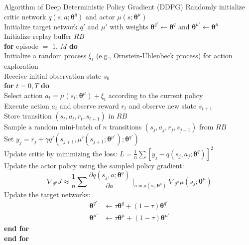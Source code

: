 \documentclass[11pt]{article}
\begin{document}
\begin{itembox}[l]{Algorithm of Deep Deterministic Policy Gradient (DDPG) \citep{Lillicrap:etal:2015}}
	Randomly initialize critic network $q(s, a; \bm{\theta}^q)$ and actor $\mu(s; \bm{\theta}^\mu)$\\
	Initialize target network $q'$ and $\mu'$ with weights $\bm{\theta}^{q'} \leftarrow \bm{\theta}^{q}$ and $\bm{\theta}^{\mu'} \leftarrow \bm{\theta}^{\mu}$\\
	Initialize replay buffer $RB$\\
	\textbf{for} episode $=$ $1$, $M$ \textbf{do}\\
	\hspace{2zw} Initialize a random process $\xi_t$ (e.g., Ornstein-Uhlenbeck process) for action exploration\\
	\hspace{2zw} Receive initial observation state $s_0$\\
	\hspace{2zw} \textbf{for} $t = 0, T$ \textbf{do}\\
		\hspace{4zw} Select action $a_t = \mu(s_t; \bm{\theta}^\mu) + \xi_t$ according to the current policy \\
		\hspace{4zw} Execute action $a_t$ and observe reward $r_t$ and observe new state $s_{t+1}$ \\
		\hspace{4zw} Store transition $(s_t, a_t, r_t, s_{t+1})$ in $RB$ \\
		\hspace{4zw} Sample a random mini-batch of $n$ transitions $(s_j, a_j, r_j, s_{j+1})$ from $RB$ \\
		\hspace{4zw} Set $y_j = r_j + \gamma q'(s_{j+1}, \mu'(s_{j+1}; \bm{\theta}^{\mu'}); \bm{\theta}^{q'})$ \\
		\hspace{4zw} Update critic by minimizing the loss: $L = \frac{1}{n} \sum [y_j - q(s_j, a_j; \bm{\theta}^q)]^2$ \\
		\hspace{4zw} Update the actor policy using the sampled policy gradient:
		\begin{equation}
		\nabla_{\theta^{\mu}} J \approx \frac{1}{n}\sum \frac{\partial q(s_j,a; \bm{\theta}^q)}{\partial a} \mid_{a = \mu(s_j; \bm{\theta}^\mu)} \nabla_{\theta^{\mu}} \mu(s_j; \bm{\theta}^\mu)
		\end{equation}
		\hspace{4zw} Update the target networks:\\
		\begin{align}
			\bm{\theta}^{q'} &\leftarrow \tau \bm{\theta}^{q} + (1-\tau) \bm{\theta}^{q'} \\
			\bm{\theta}^{\mu'} &\leftarrow \tau \bm{\theta}^{\mu} + (1-\tau) \bm{\theta}^{\mu'}
		\end{align}
	\hspace{2zw} \textbf{end for}\\
	\textbf{end for}
\end{itembox}
\end{document}
